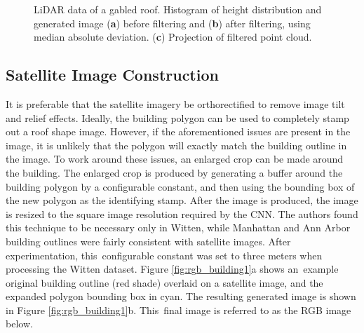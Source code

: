 \begin{figure}[t]
\begin{minipage}{0.45\linewidth}
\begin{subfigure}[b]{\textwidth}
           \caption{}
           \label{fig:point_cloud_projection} 
        \end{subfigure}
    \end{minipage}
\caption[Results of LiDAR Filtering]{LiDAR data of a gabled roof.  Histogram of height distribution and generated image (\textbf{a}) before filtering and (\textbf{b}) after filtering, using median absolute deviation. (\textbf{c}) Projection of filtered point cloud. }
\label{fig:lidar_filt}
\end{figure}


\subsection{Satellite Image Construction}\label{sec:satellite_construction}

It is preferable that the satellite imagery be orthorectified to remove image tilt and relief effects. Ideally, the building polygon can be used to completely stamp out a roof shape image. However, if the aforementioned issues are present in the image, it is unlikely that the polygon will exactly match the building outline in the image. To work around these issues, an enlarged crop can be made around the building. The enlarged crop is produced by generating a buffer around the building polygon by a configurable constant, and then using the bounding box of the new polygon as the identifying stamp.  After the image is produced, the image is resized to the square image resolution required by the \ac{CNN}. The authors found this technique to be necessary only in Witten, while Manhattan and Ann Arbor building outlines were fairly consistent with satellite images. After experimentation, this~configurable constant was set to three meters when processing the Witten dataset.  
Figure \ref{fig:rgb_building1}a shows an~example original building outline (red shade) overlaid on a satellite image, and the expanded polygon bounding box in cyan. The resulting generated image is shown in Figure \ref{fig:rgb_building1}b. This~final image is referred to as the RGB image below.



